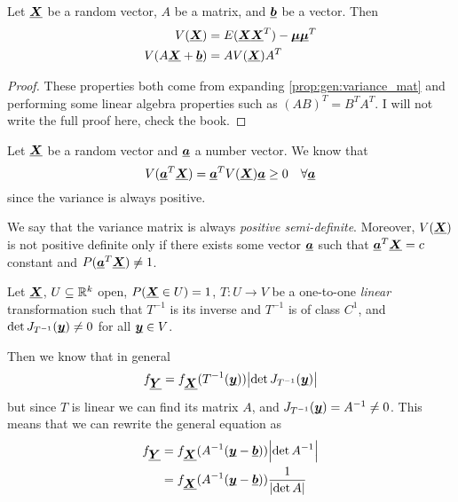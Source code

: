 \documentclass[14pt]{extarticle}
\renewcommand{\vec}[1]{\uvec{#1}}
\begin{document}
\begin{theorem}
    Let $\vec X$ be a random vector, $A$ be a matrix, and $\vec b$ be a vector.
    Then
    \begin{align}
        V(\vec X)            & = E(\vec X \vec X^T) - \vec \mu \vec \mu^T \\
        V(A \vec X + \vec b) & = A V(\vec X) A^T
    \end{align}
\end{theorem}

\begin{proof}
    These properties both come from expanding \autoref{prop:gen:variance_mat} and performing some linear algebra properties such as $(AB)^T = B^T A^T$.
    I will not write the full proof here, check the book.
\end{proof}

\begin{proposition}
    Let $\vec X$ be a random vector and $\vec a$ a number vector.
    We know that
    \begin{equation}
        V(\vec a^T \vec X) = \vec a^T V(\vec X) \vec a \geq 0 \quad \forall \vec a
    \end{equation}
    since the variance is always positive.

    We say that the variance matrix is always \emph{positive semi-definite}.
    Moreover, $V(\vec X)$ is not positive definite only if there exists some vector $\vec a$ such that $\vec a^T \vec X = c$ constant and $P(\vec a^T \vec X) \ne 1$.
\end{proposition}

\begin{proposition}
    Let $\vec X$, $U \subseteq \mathbb{R}^k$ open, $P(\vec X \in U) = 1$, $T: U \to V$ be a one-to-one \emph{linear} transformation such that $T^{-1}$ is its inverse and $T^{-1}$ is of class $C^1$, and $\det J_{T^{-1}}(\vec y) \ne 0$ for all $\vec y \in V$.

    Then we know that in general
    \begin{equation}
        f_{\vec Y} = f_{\vec X}(T^{-1}(\vec y)) \abs{\det J_{T^{-1}}(\vec y)}
    \end{equation}
    but since $T$ is linear we can find its matrix $A$, and $J_{T^{-1}}(\vec y) = A^{-1} \ne 0$.
    This means that we can rewrite the general equation as
    \begin{align}
        f_{\vec Y} & = f_{\vec X}(A^{-1}(\vec y - \vec b)) \abs{\det A^{-1}}      \\
                   & = f_{\vec X}(A^{-1}(\vec y - \vec b)) \frac{1}{\abs{\det A}}
    \end{align}
\end{proposition}
\end{document}
